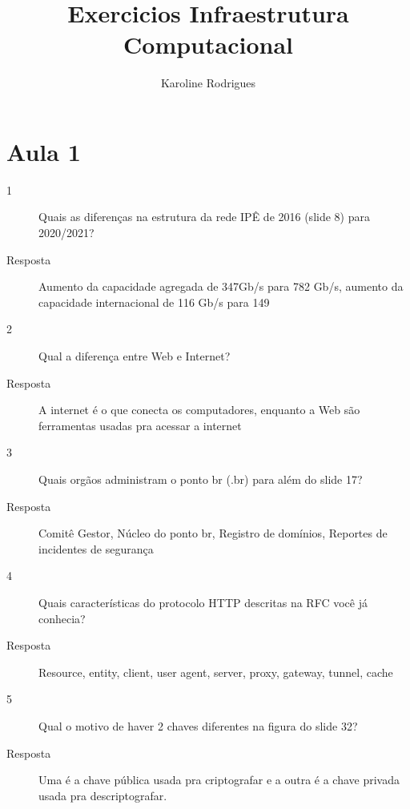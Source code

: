 \documentclass[12pt]{article}
\title{Exercicios Infraestrutura Computacional }
\author{Karoline Rodrigues}
\begin{document}
\normalsize
\maketitle
\section{Aula 1}
\label{sec:Aula1}
\begin{description}
    \item[1] Quais as diferenças na estrutura da rede IPÊ de 2016 (slide 8) para 2020/2021?
    \item[Resposta] Aumento da capacidade agregada de 347Gb/s para 782 Gb/s, aumento da capacidade internacional de 116 Gb/s para 149 
    \item[2] Qual a diferença entre Web e Internet?
    \item[Resposta] A internet é o que conecta os computadores, enquanto a Web são ferramentas usadas pra acessar a internet
    \item[3] Quais orgãos administram o ponto br (.br) para além do slide 17?
    \item[Resposta] Comitê Gestor, Núcleo do ponto br, Registro de domínios, Reportes de incidentes de segurança
    \item[4] Quais características do protocolo HTTP descritas na RFC você já conhecia?
    \item[Resposta] Resource, entity, client, user agent, server, proxy, gateway, tunnel, cache
    \item[5] Qual o motivo de haver 2 chaves diferentes na figura do slide 32?
    \item[Resposta]Uma é a chave pública usada pra criptografar e a outra é a chave privada usada pra descriptografar.
\end{description}
\end{document}
